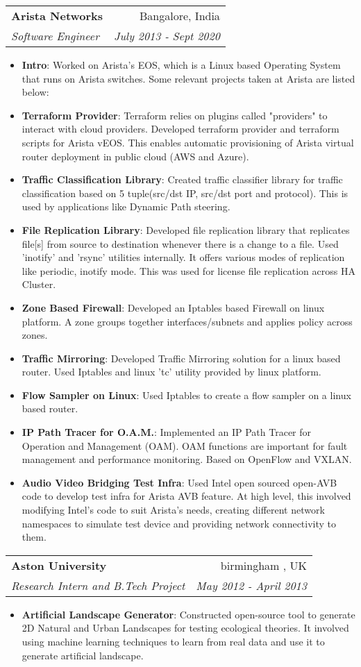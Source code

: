 \documentclass[letterpaper,11pt]{article}
\makeatletter
\newcommand{\resumeItem}[2]{
  \item\small{
    \textbf{#1}{: #2 \vspace{-2pt}}
  }
}
\newcommand{\resumeSubheading}[4]{
  \vspace{-1pt}\item
    \begin{tabular*}{0.97\textwidth}[t]{l@{\extracolsep{\fill}}r}
      \textbf{#1} & #2 \\
      \textit{\small#3} & \textit{\small #4} \\
    \end{tabular*}\vspace{-5pt}
}
\newcommand{\resumeItemListStart}{\begin{itemize}}
\newcommand{\resumeItemListEnd}{\end{itemize}\vspace{-5pt}}
\makeatother
\begin{document}
    \resumeSubheading
      {Arista Networks}{Bangalore, India}
      {Software Engineer}{July 2013 - Sept 2020}
      \resumeItemListStart
        \resumeItem{Intro}
          {Worked on Arista’s EOS, which is a Linux based Operating System that runs on Arista switches. Some relevant projects taken at Arista are listed below:}
        \resumeItem{Terraform Provider}
          {Terraform relies on plugins called "providers" to interact with cloud providers. Developed terraform provider and terraform scripts for Arista vEOS. This enables automatic provisioning of Arista virtual router deployment in public cloud (AWS and Azure).}
        \resumeItem{Traffic Classification Library}
          {Created traffic classifier library for traffic classification based on 5 tuple(src/dst IP, src/dst port and protocol). This is used by applications like Dynamic Path steering.}
        \resumeItem{File Replication Library}
          {Developed file replication library that replicates file[s] from source to destination whenever there is a change to a file. Used ’inotify’ and ’rsync’ utilities internally. It offers various modes of replication like periodic, inotify mode. This was used for license file replication across HA Cluster.}
        \resumeItem{Zone Based Firewall}
          {Developed an Iptables based Firewall on linux platform. A zone groups together interfaces/subnets and applies policy across zones.}
        \resumeItem{Traffic Mirroring}
          {Developed Traffic Mirroring solution for a linux based router. Used Iptables and linux ’tc’ utility provided by linux platform.}
        \resumeItem{Flow Sampler on Linux}
          {Used Iptables to create a flow sampler on a linux based router.}
        \resumeItem{IP Path Tracer for O.A.M.}
          {Implemented an IP Path Tracer for Operation and Management (OAM). OAM functions are important for fault management and performance monitoring. Based on OpenFlow and VXLAN.}
        \resumeItem{Audio Video Bridging Test Infra}
          {Used Intel open sourced open-AVB code to develop test infra for Arista AVB feature. At high level, this involved modifying Intel’s code to suit Arista’s needs, creating different network namespaces to simulate test device and providing network connectivity to them.}
      \resumeItemListEnd

    \resumeSubheading
      {Aston University}{birmingham , UK}
      {Research Intern and B.Tech Project}{May 2012 - April 2013}
      \resumeItemListStart
        \resumeItem{Artificial Landscape Generator}
          {Constructed open-source tool to generate 2D Natural and Urban Landscapes for testing ecological theories. It involved using machine learning techniques to learn from real data and use it to generate artificial landscape.}
      \resumeItemListEnd
\end{document}
